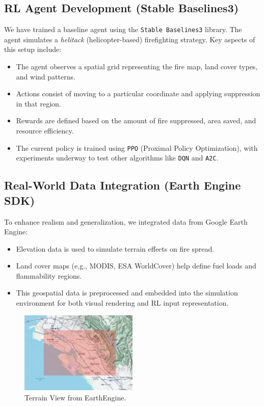 \documentclass[conference]{IEEEtran}
\begin{document}
\subsection{RL Agent Development (Stable Baselines3)}
We have trained a baseline agent using the \texttt{Stable Baselines3} library. The agent simulates a \textit{helitack} (helicopter-based) firefighting strategy. Key aspects of this setup include:

\begin{itemize}
    \item The agent observes a spatial grid representing the fire map, land cover types, and wind patterns.
    \item Actions consist of moving to a particular coordinate and applying suppression in that region.
    \item Rewards are defined based on the amount of fire suppressed, area saved, and resource efficiency.
    \item The current policy is trained using \texttt{PPO} (Proximal Policy Optimization), with experiments underway to test other algorithms like \texttt{DQN} and \texttt{A2C}.
\end{itemize}

\subsection{Real-World Data Integration (Earth Engine SDK)}
To enhance realism and generalization, we integrated data from Google Earth Engine:

\begin{itemize}
    \item Elevation data is used to simulate terrain effects on fire spread.
    \item Land cover maps (e.g., MODIS, ESA WorldCover) help define fuel loads and flammability regions.
    \item This geospatial data is preprocessed and embedded into the simulation environment for both visual rendering and RL input representation.
\end{itemize}

\begin{figure}[h!]
    \centering
    \includegraphics[width=0.5\textwidth]{terrain.png}
    \caption{Terrain View from EarthEngine.}
\end{figure}
\end{document}
